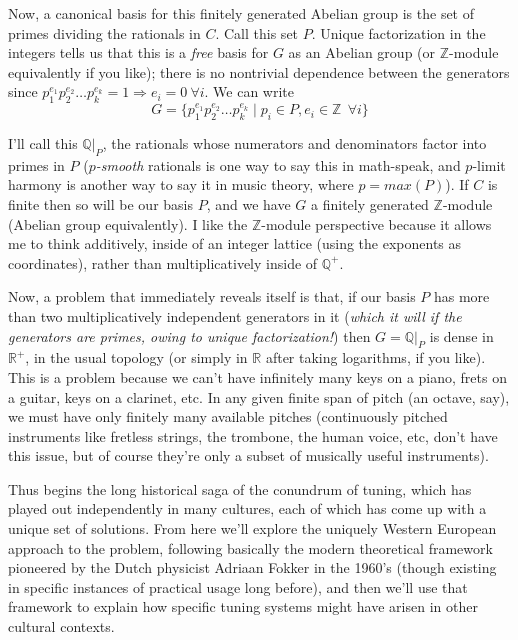 \documentclass[12pt]{article}
\newcommand{\RR}{\mathbb{R}}      %
\newcommand{\ZZ}{\mathbb{Z}}      %
\newcommand{\QQ}{\mathbb{Q}}      %
\begin{document}
\par
Now, a canonical basis for this finitely generated Abelian group is the set of primes dividing the rationals in $C$.  Call this set $P$.  Unique factorization in the integers tells us that this is a \emph{free} basis for $G$ as an Abelian group (or $\ZZ$-module equivalently if you like); there is no nontrivial dependence between the generators since $p_1^{e_1}p_2^{e_2}\ldots p_k^{e_k}=1\Rightarrow e_i=0\ \forall i$.  We can write
\[G=\{ p_1^{e_1}p_2^{e_2}\ldots p_k^{e_k}\mid p_i\in P,e_i\in\ZZ\ \ \forall i\}\]
\par
I'll call this $\QQ |_P$, the rationals whose numerators and denominators factor into primes in $P$ ($p$\emph{-smooth} rationals is one way to say this in math-speak, and $p$-limit harmony is another way to say it in music theory, where $p=max(P)$).
If $C$ is finite then so will be our basis $P$, and we have $G$ a finitely generated $\ZZ$-module (Abelian group equivalently).  I like the $\ZZ$-module perspective because it allows me to think additively, inside of an integer lattice (using the exponents as coordinates), rather than multiplicatively inside of $\QQ^+$.\\
\par
Now, a problem that immediately reveals itself is that, if our basis $P$ has more than two multiplicatively independent generators in it (\emph{which it will if the generators are primes, owing to unique factorization!}) then $G=\QQ |_P$ is dense in $\RR^+$, in the usual topology (or simply in $\RR$ after taking logarithms, if you like).  This is a problem because we can't have infinitely many keys on a piano, frets on a guitar, keys on a clarinet, etc.  In any given finite span of pitch (an octave, say), we must have only finitely many available pitches (continuously pitched instruments like fretless strings, the trombone, the human voice, etc, don't have this issue, but of course they're only a subset of musically useful instruments).\\
\par
Thus begins the long historical saga of the conundrum of tuning, which has played out independently in many cultures, each of which has come up with a unique set of solutions.  From here we'll explore the uniquely Western European approach to the problem, following basically the modern theoretical framework pioneered by the Dutch physicist Adriaan Fokker in the 1960's (though existing in specific instances of practical usage long before), and then we'll use that framework to explain how specific tuning systems might have arisen in other cultural contexts.\\
\end{document}
